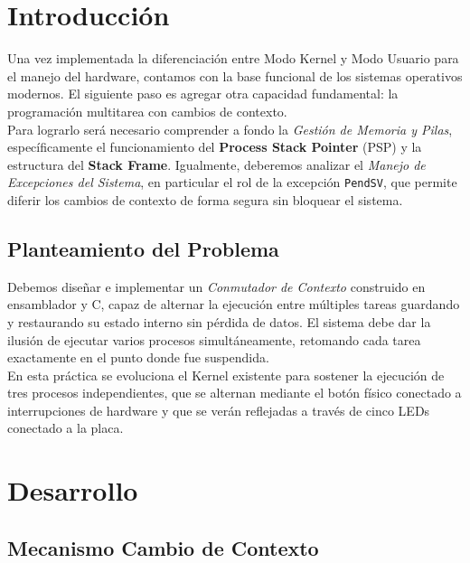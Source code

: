 \documentclass[12pt,letterpaper]{article}
\begin{document}


\newpage

\section*{Introducción}

Una vez implementada la diferenciación entre Modo Kernel y Modo Usuario para el manejo del hardware, contamos con la base funcional de los sistemas operativos modernos. El siguiente paso es agregar otra capacidad fundamental: la programación multitarea con cambios de contexto.\\

\noindent
Para lograrlo será necesario comprender a fondo la \textit{Gestión de Memoria y Pilas}, específicamente el funcionamiento del \textbf{Process Stack Pointer} (PSP) y la estructura del \textbf{Stack Frame}. Igualmente, deberemos analizar el \textit{Manejo de Excepciones del Sistema}, en particular el rol de la excepción \texttt{PendSV}, que permite diferir los cambios de contexto de forma segura sin bloquear el sistema.

\subsection*{Planteamiento del Problema}

Debemos diseñar e implementar un \textit{Conmutador de Contexto} construido en ensamblador y C, capaz de alternar la ejecución entre múltiples tareas guardando y restaurando su estado interno sin pérdida de datos. El sistema debe dar la ilusión de ejecutar varios procesos simultáneamente, retomando cada tarea exactamente en el punto donde fue suspendida.\\

\noindent
En esta práctica se evoluciona el Kernel existente para sostener la ejecución de tres procesos independientes, que se alternan mediante el botón físico conectado a interrupciones de hardware y que se verán reflejadas a través de cinco LEDs conectado a la placa.

\newpage

\section*{Desarrollo}

\subsection*{Mecanismo Cambio de Contexto}
\end{document}
